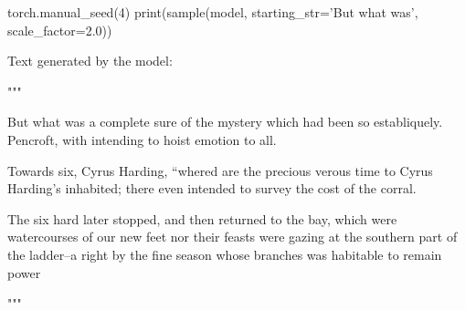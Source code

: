 \begin{pythoncode}
torch.manual_seed(4)
print(sample(model, starting_str='But what was', scale_factor=2.0))
\end{pythoncode}

Text generated by the model:

"""

\noindent
But what was a complete sure of
the mystery which had been so establiquely. Pencroft, with intending to hoist emotion to all.

Towards six, Cyrus Harding, “whered are the precious verous time to Cyrus Harding’s inhabited; there even intended to survey the cost of the corral.

The six hard later stopped, and then returned to the bay, which were watercourses of our new feet nor their feasts were gazing at the southern part of the ladder--a
right by the fine season whose branches was habitable to remain power 

"""